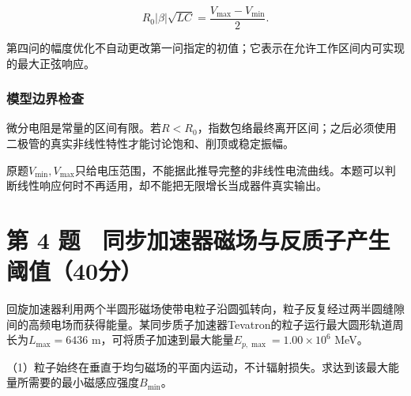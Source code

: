 \documentclass[12pt,a4paper,fontset=fandol]{ctexart}
\begin{document}
\[
R_0|\beta|\sqrt{LC}
=\frac{V_{\max}-V_{\min}}2.
\]

第四问的幅度优化不自动更改第一问指定的初值；它表示在允许工作区间内可实现的最大正弦响应。

\subsubsection{模型边界检查}\label{ux6a21ux578bux8fb9ux754cux68c0ux67e5}

微分电阻是常量的区间有限。若\(R<R_0\)，指数包络最终离开区间；之后必须使用二极管的真实非线性特性才能讨论饱和、削顶或稳定振幅。

原题\(V_{\min},V_{\max}\)只给电压范围，不能据此推导完整的非线性电流曲线。本题可以判断线性响应何时不再适用，却不能把无限增长当成器件真实输出。

\clearpage

\section{第 4
题　同步加速器磁场与反质子产生阈值（40分）}\label{ux7b2c-4-ux9898-ux540cux6b65ux52a0ux901fux5668ux78c1ux573aux4e0eux53cdux8d28ux5b50ux4ea7ux751fux9608ux503c40ux5206}

回旋加速器利用两个半圆形磁场使带电粒子沿圆弧转向，粒子反复经过两半圆缝隙间的高频电场而获得能量。某同步质子加速器Tevatron的粒子运行最大圆形轨道周长为\(L_{\max}=6436\)
m，可将质子加速到最大能量\(E_{p,\max}=1.00\times10^6\) MeV。

（1）粒子始终在垂直于均匀磁场的平面内运动，不计辐射损失。求达到该最大能量所需要的最小磁感应强度\(B_{\min}\)。

\begin{center}
\begin{minipage}{\linewidth}
\centering\begingroup{}
\ifdim\wd\diagrambox>.88\linewidth
\sbox{\diagrambox}{\resizebox{.88\linewidth}{!}{\usebox{\diagrambox}}}\fi
\ifdim\ht\diagrambox>.38\textheight
\resizebox{!}{.38\textheight}{\usebox{\diagrambox}}
\else\usebox{\diagrambox}\fi
\par{}\endgroup\end{minipage}\end{center}
\end{document}
